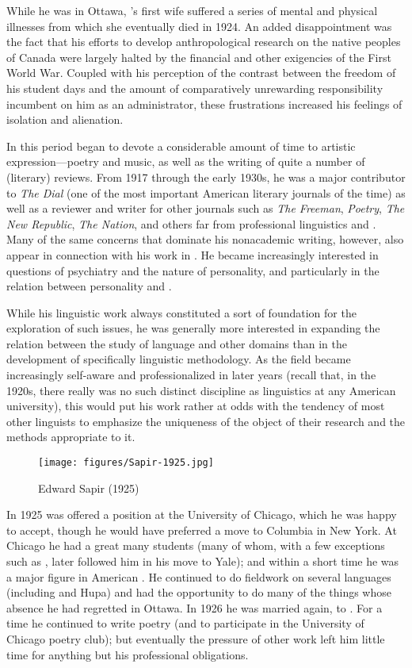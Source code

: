 While he was in Ottawa, {\Sapir}'s first wife 
suffered a series of mental and physical illnesses from which she
eventually died in 1924. An added disappointment was the fact that his
efforts to develop anthropological research on the native peoples of
Canada were largely halted by the financial and other exigencies of
the First World War. Coupled with his perception of the {contrast}
between the freedom of his student days and the amount of
comparatively unrewarding responsibility incumbent on him as an
administrator, these frustrations increased his feelings of isolation
and alienation.

In this period {\Sapir} began to devote a considerable amount of time to
artistic expression—poetry and music, as well as the writing of quite
a number of (literary) reviews. From 1917 through the early 1930s, he
was a major contributor to \textsl{The Dial} (one of the most
important American literary journals of the time) as well as a
reviewer and writer for other journals such as \textsl{The Freeman},
\textsl{Poetry}, \textsl{The New Republic}, \textsl{The Nation}, and
others far from professional linguistics and . Many of the
same concerns that dominate his nonacademic writing, however, also
appear in connection with his work in . He became
increasingly interested in questions of psychiatry and the nature of
personality, and particularly in the relation between personality and
.

While his linguistic work always constituted a sort of foundation for
the exploration of such issues, he was generally more interested in
expanding the relation between the study of language and other domains
than in the development of specifically linguistic methodology. As the
field became increasingly self-aware and professionalized in later
years (recall that, in the 1920s, there really was no such distinct
discipline as linguistics at any American university), this would put
his work rather at odds with the tendency of most other linguists to
emphasize the uniqueness of the object of their research and the
methods appropriate to it.

\begin{wrapfigure}{r}{.4\textwidth}
  \texttt{[image: figures/Sapir-1925.jpg]}
  \caption{Edward Sapir (1925)}
  \label{fig:ch.sapir.sapir_1925}
\end{wrapfigure}
In 1925 {\Sapir} was offered a position at the University of Chicago,
which he was happy to accept, though he would have preferred a move to
Columbia in New York. At Chicago he had a great many students (many of
whom, with a few exceptions such as {\Hoijer}, later followed him in his
move to Yale); and within a short time he was a major figure in
American . He continued to do fieldwork on several
languages (including  and Hupa) and had the opportunity to do
many of the things whose absence he had regretted in Ottawa. In 1926
he was married again, to . For a
time he continued to write poetry (and to participate in the
University of Chicago poetry club); but eventually the pressure of
other work left him little time for anything but his professional
obligations.

